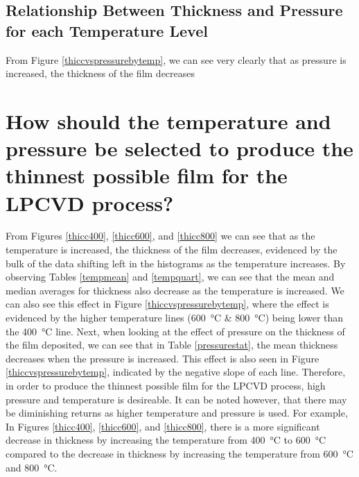\documentclass[letterpaper]{article}
\begin{document}
\subsection{Relationship Between Thickness and Pressure for each Temperature Level}

From Figure \ref{thiccvspressurebytemp}, we can see very clearly that as pressure
is increased, the thickness of the film decreases

\section{How should the temperature and pressure be selected to produce the thinnest possible film for the LPCVD process?}

From Figures \ref{thicc400}, \ref{thicc600}, and \ref{thicc800} we can see that
as the temperature is increased, the thickness of the film decreases, evidenced
by the bulk of the data shifting left in the histograms as the temperature
increases. By observing Tables \ref{tempmean} and \ref{tempquart}, we can see
that the mean and median averages for thickness also decrease as the temperature
is increased. We can also see this effect in Figure \ref{thiccvspressurebytemp},
where the effect is evidenced by the higher temperature lines
(\SI{600}{\celsius} \& \SI{800}{\celsius}) being lower than the
\SI{400}{\celsius} line. Next, when looking at the effect of pressure on the
thickness of the film deposited, we can see that in Table \ref{pressurestat},
the mean thickness decreases when the pressure is increased. This effect is also
seen in Figure \ref{thiccvspressurebytemp}, indicated by the negative slope of
each line. Therefore, in order to produce the thinnest possible film for the
LPCVD process, high pressure and temperature is desireable. It can be noted
however, that there may be diminishing returns as higher temperature and
pressure is used. For example, In Figures \ref{thicc400}, \ref{thicc600}, and
\ref{thicc800}, there is a more significant decrease in thickness by increasing
the temperature from \SI{400}{\celsius} to \SI{600}{\celsius} compared to the
decrease in thickness by increasing the temperature from \SI{600}{\celsius}
and \SI{800}{\celsius}.
\end{document}
